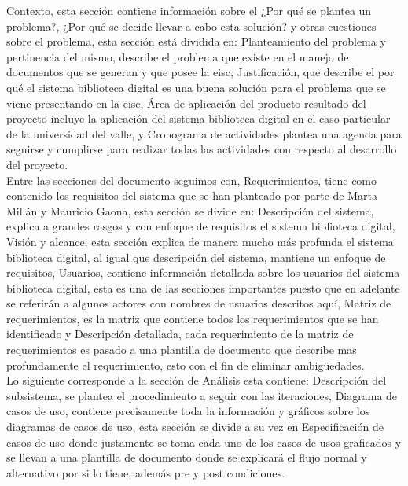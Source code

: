 \documentclass[]{article}
\begin{document}
Contexto, esta sección contiene información sobre el ¿Por qué se plantea un problema?, ¿Por qué se
decide llevar a cabo esta solución? y otras cuestiones sobre el problema, esta sección está
dividida en: Planteamiento del problema y pertinencia del mismo, describe el problema que existe en
el manejo de documentos que se generan y que posee la eisc, Justificación, que describe el por qué
el sistema biblioteca digital es una buena solución para el problema que se viene presentando en la
eisc, Área de aplicación del producto resultado del proyecto incluye la aplicación del sistema
biblioteca digital en el caso particular de la universidad del valle, y Cronograma de actividades
plantea una agenda para seguirse y cumplirse para realizar todas las actividades con respecto al
desarrollo del proyecto.\\

Entre las secciones del documento seguimos con, Requerimientos, tiene como contenido los requisitos
del sistema que se han planteado por parte de Marta Millán y Mauricio Gaona, esta sección se divide
en: Descripción del sistema, explica a grandes rasgos y con enfoque de requisitos el sistema
biblioteca digital,  Visión y alcance, esta sección explica de manera mucho más profunda el sistema
biblioteca digital, al igual que descripción del sistema, mantiene un enfoque de requisitos,
Usuarios,  contiene información detallada sobre los usuarios del sistema biblioteca digital, esta es una de las secciones importantes puesto que en adelante se referirán a algunos actores con nombres de usuarios descritos aquí, Matriz de requerimientos, es la matriz que contiene todos los
requerimientos que se han identificado y  Descripción detallada, cada requerimiento de la matriz de
requerimientos es pasado a una plantilla de documento que describe mas profundamente el
requerimiento, esto con el fin de eliminar ambigüedades.\\

Lo siguiente corresponde a la sección de Análisis esta contiene: Descripción del subsistema, se
plantea el procedimiento a seguir con las iteraciones, Diagrama de casos de uso, contiene
precisamente toda la información y gráficos sobre los diagramas de casos de uso, esta sección se
divide a su vez en Especificación de casos de uso donde justamente se toma cada uno de los casos de
usos graficados y se llevan a una plantilla de documento donde se explicará el flujo normal y
alternativo por si lo tiene, además pre y post condiciones.\\
\end{document}
